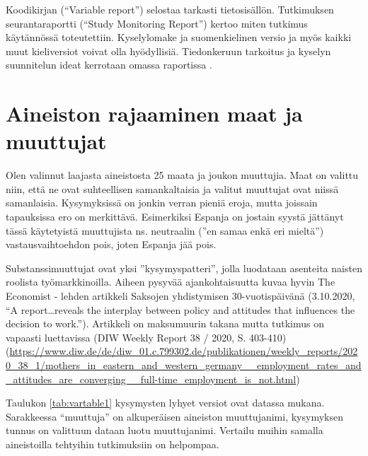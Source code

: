 \documentclass[
  finnish,
]{book}
\begin{document}
Koodikirjan (``Variable report'') \citep{RefWorks:doc:5bb9041be4b06677e5e61f83} selostaa
tarkasti tietosisällön. Tutkimuksen seurantaraportti (``Study Monitoring Report'')
\citep{RefWorks:doc:5c053d69e4b0191a580d6451} kertoo miten tutkimus käytännössä
toteutettiin. Kyselylomake \citep{RefWorks:doc:5bb9044fe4b0dfeb95352229} ja
suomenkielinen versio \citep{RefWorks:doc:5bb90a0ae4b018435936a488} ja myös kaikki muut
kieliversiot voivat olla hyödyllisiä. Tiedonkeruun tarkoitus ja kyselyn
suunnitelun ideat kerrotaan omassa raportissa \citep{RefWorks:doc:5f9439fde4b04741789a2187}.

\hypertarget{aineiston-rajaaminen-maat-ja-muuttujat}{%
\section{Aineiston rajaaminen maat ja muuttujat}\label{aineiston-rajaaminen-maat-ja-muuttujat}}

Olen valinnut laajasta aineistosta 25 maata ja joukon muuttujia. Maat on valittu
niin, että ne ovat suhteellisen samankaltaisia ja valitut muuttujat ovat niissä
samanlaisia. Kysymyksissä on jonkin verran pieniä eroja, mutta joissain
tapauksissa ero on merkittävä. Esimerkiksi Espanja on jostain syystä jättänyt
tässä käytetyistä muuttujista ns. neutraalin (''en samaa enkä eri mieltä'')
vastausvaihtoehdon pois, joten Espanja jää pois.

Substanssimuuttujat ovat yksi ''kysymyspatteri'', jolla luodataan asenteita
naisten roolista työmarkkinoilla. Aiheen pysyvää ajankohtaisuutta kuvaa hyvin
The Economist - lehden artikkeli Saksojen yhdistymisen 30-vuotispäivänä
(3.10.2020, ``A report\ldots reveals the interplay between policy and attitudes that
influences the decision to work.'').
Artikkeli on maksumuurin takana mutta tutkimus on vapaasti
luettavissa (DIW Weekly Report 38 / 2020, S. 403-410)
(\url{https://www.diw.de/de/diw_01.c.799302.de/publikationen/weekly_reports/2020_38_1/mothers_in_eastern_and_western_germany__employment_rates_and_attitudes_are_converging__full-time_employment_is_not.html})

Taulukon \ref{tab:vartable1} kysymysten lyhyet versiot ovat datassa mukana.
Sarakkeessa ``muuttuja'' on alkuperäisen aineiston muuttujanimi,
kysymyksen tunnus on valittuun dataan luotu muuttujanimi. Vertailu muihin samalla
aineistoilla tehtyihin tutkimuksiin on helpompaa.
\end{document}
